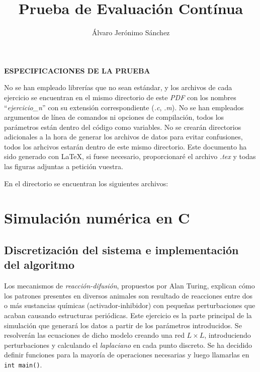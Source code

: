 \documentclass[12pt]{article}
\title{\vspace{-1.8cm} Prueba de Evaluación Contínua}
\author{Álvaro Jerónimo Sánchez}
\date{\vspace{-0.6cm}\small\mydate}
\newcommand{\code}[1]{\colorbox{mygray}{\lstinline|#1|}}
\begin{document}
\maketitle
\setcounter{section}{0}
\renewcommand{\tablename}{Tabla}

\textbf{ESPECIFICACIONES DE LA PRUEBA}

No se han empleado librerías que no sean estándar, y los archivos de cada ejercicio se encuentran en el mismo directorio de este \textit{PDF} con los nombres ``\textit{ejercicio\_n}'' con su extensión correspondiente (\textit{.c}, \textit{.m}). No se han empleados argumentos de línea de comandos ni opciones de compilación, todos los parámetros están dentro del código como variables. No se crearán directorios adicionales a la hora de generar los archivos de datos para evitar confusiones, todos los arhcivos estarán dentro de este mismo directorio. Este documento ha sido generado con \LaTeX , si fuese necesario, proporcionaré el archivo \textit{.tex} y todas las figuras adjuntas a petición vuestra.

En el directorio se encuentran los siguientes archivos:


\section{Simulación numérica en C}

\subsection{Discretización del sistema e implementación del algoritmo}

Los mecanismos de \textit{reacción-difusión}, propuestos por Alan Turing, explican cómo los patrones presentes en diversos animales son resultado de reacciones entre dos o más sustancias químicas (activador-inhibidor) con pequeñas perturbaciones que acaban causando estructuras periódicas. Este ejercicio es la parte principal de la simulación que generará los datos a partir de los parámetros introducidos. Se resolverán las ecuaciones de dicho modelo creando una red $L \times L$, introduciendo perturbaciones y calculando el \textit{laplaciano} en cada punto discreto. Se ha decidido definir funciones para la mayoría de operaciones necesarias y luego llamarlas en \code{int main()}.
\end{document}
